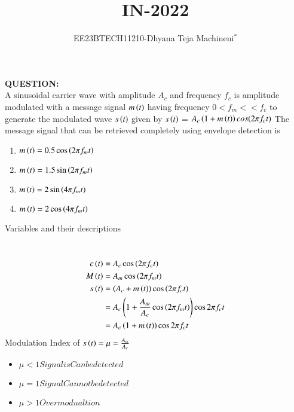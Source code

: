 \documentclass[journal,12pt,twocolumn]{IEEEtran}
\theoremstyle{remark}
\begin{document}

\vspace{3cm}
\title{\textbf{IN-2022}}
\author{EE23BTECH11210-Dhyana Teja Machineni$^{*}$%
}
\maketitle
\newpage
\bigskip

\textbf{QUESTION:}\\
A sinusoidal carrier wave with amplitude $A_c$ and frequency $f_c$ is amplitude modulated with a message signal $m\left(t\right)$ having frequency $0 < f_m << f_c$ to generate the modulated wave $s\left(t\right)$ given by
$s\left(t\right)$ = $A_c\left(1 + m\left(t\right)\right)cos (2\pi f_c t)$
The message signal that can be retrieved completely using
envelope detection is \underline{{\hspace{1.5in}}}
\begin{enumerate}
    \item $m\left(t\right)= 0.5 \cos{\ensuremath{\left(2 \pi f_m t\right)}}$
    \item $m\left(t\right)= 1.5 \sin{\ensuremath{\left(2 \pi f_m t\right)}}$
    \item $m\left(t\right)= 2 \sin{\ensuremath{\left(4 \pi f_m t\right)}}$
    \item $m\left(t\right)= 2 \cos{\ensuremath{\left(4 \pi f_m t\right)}}$
\end{enumerate}
\solution
\begin{table}[h]
         \label{tab:table}
         
         \caption{Variables and their descriptions}
     \end{table}\\
\begin{align}
c\left(t\right)&=A_c \cos\left(2 \pi f_c t\right)\\
   M\left(t\right)&= A_m \cos\left(2 \pi f_m t\right)\\
    s\left(t\right)&= \left(A_c+ m\left(t\right)\right) \cos\left(2\pi f_c t\right)\\
    &=A_c\left(1+\frac{A_m}{A_c} \cos\left(2 \pi f_m t\right)\right)\cos{2 \pi f_c t}\\
    &=A_c\left(1+m\left(t\right)\right)\cos{2 \pi f_c t}
\end{align}
Modulation Index of $s\left(t\right)=\mu= \frac{A_m}{A_c}$
\begin{itemize}
    \item $\mu<1  Signal is Can be detected$
    \item $\mu=1   Signal Cannot be detected $
    \item $\mu>1   Over modualtion $
\end{itemize}
\end{document}
